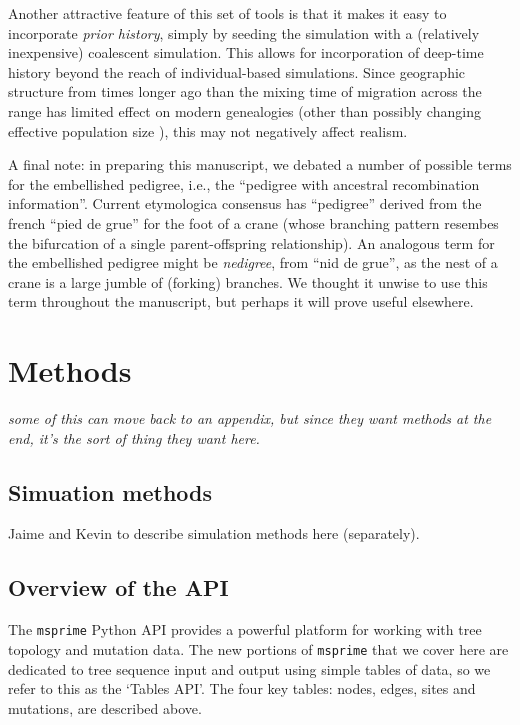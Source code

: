 \documentclass{article}
\newcommand{\msprime}{\texttt{msprime}}
\newcommand{\plr}[1]{{\em \color{blue} #1}}
\begin{document}
Another attractive feature of this set of tools
is that it makes it easy to incorporate \emph{prior history},
simply by seeding the simulation with a (relatively inexpensive) coalescent simulation.
This allows for incorporation of deep-time history beyond the reach of individual-based simulations. 
Since geographic structure from times longer ago than the mixing
time of migration across the range has limited effect on modern genealogies
\citep{wilkins2004separation} (other than possibly changing effective population
size \citet{barton2002neutral,cox2002stepping}), this may not negatively affect realism.


A final note:
in preparing this manuscript, 
we debated a number of possible terms for the embellished pedigree,
i.e., the ``pedigree with ancestral recombination information''.
Current etymologica consensus \citep{liberman2014little} has
``pedigree'' derived from the french ``pied de grue'' for the foot of a crane
(whose branching pattern resembes the bifurcation of a single parent-offspring relationship).
An analogous term for the embellished pedigree might be \emph{nedigree},
from ``nid de grue'',
as the nest of a crane is a large jumble of (forking) branches.
We thought it unwise to use this term throughout the manuscript,
but perhaps it will prove useful elsewhere.


\section*{Methods}

\plr{some of this can move back to an appendix, but since they want methods at the end,
it's the sort of thing they want here.}

\subsection*{Simuation methods}

Jaime and Kevin to describe simulation methods here (separately).

\subsection*{Overview of the API}

The \msprime{} Python API provides a powerful platform for working with tree topology and mutation data. 
The new portions of \msprime{} that we cover here
are dedicated to tree sequence input and output using simple tables of data,
so we refer to this as the `Tables API'.
The four key tables: nodes, edges, sites and mutations, are described above.
\end{document}
